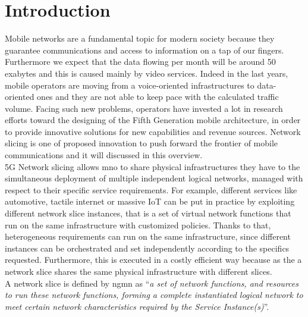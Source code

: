 \documentclass[a4paper,12pt]{report} %
\begin{document}
\section{Introduction}
Mobile networks are a fundamental topic for modern society because they guarantee communications and access
to information on a tap of our fingers. Furthermore we expect that the data flowing per month will be around 50 exabytes and this is caused mainly by video services.
Indeed in the last years, mobile operators are moving from a voice-oriented infrastructures to
data-oriented ones and they are not able to keep pace with the calculated traffic volume. Facing such new problems, operators have
invested a lot in research efforts toward the designing of the Fifth Generation mobile architecture, in order to provide innovative solutions for new capabilities and revenue sources. Network slicing is one of proposed innovation to push forward the frontier of mobile communications and it will discussed in this overview.\\
5G Network slicing allows \gls{mno} to share
physical infrastructures they have to the simultaneous deployment
of multiple independent logical networks, managed with respect
to their specific service requirements. 
For example, different services like automotive, tactile internet or massive IoT can be put in practice by exploiting different network slice
instances, that is a set of virtual network functions
that run on the same infrastructure with customized policies. Thanks to that,
heterogeneous requirements can run on the same infrastructure, since
different instances can be orchestrated and set independently
according to the specifics requested. Furthermore, this is executed in a
costly efficient way because as the a network slice shares the same
physical infrastructure with different slices.\\
A network slice is defined by \gls{ngmn} as “\textit{a set of network functions, and
resources to run these network functions, forming a complete instantiated
logical network to meet certain network characteristics required by the Service
Instance(s)}”.\\
\end{document}
